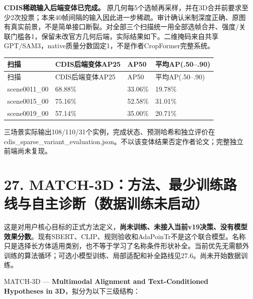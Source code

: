 \documentclass[UTF8,fontset=fandol]{ctexart}
\begin{document}
\textbf{CDIS稀疏输入后端变体已完成。} 原几何每5个选帧再采样，并在3D合并前要求至少2次投票；本来40帧间隔的输入因此进一步稀疏。审计确认米制深度正确、原图有真实前景，不是简单接口断裂。对全部三个扫描统一用全部选帧合并、强度/关联门槛各1，保留未改官方几何后端，实际结果如下。二维掩码来自共享GPT/SAM3，native质量分数固定1，不是作者CropFormer完整系统。



{\small
\begin{longtable}{|p{}|p{}|p{}|p{}|}
\hline
扫描 & CDIS后端变体AP25 & AP50 & 平均AP(.50–.90) \\ \hline
\endfirsthead
\hline
扫描 & CDIS后端变体AP25 & AP50 & 平均AP(.50–.90) \\ \hline
\endhead
scene0011\_00 & 68.88\% & 33.06\% & 19.78\% \\ \hline
scene0015\_00 & 75.16\% & 52.58\% & 31.01\% \\ \hline
scene0019\_00 & 57.14\% & 35.00\% & 20.71\% \\ \hline
\end{longtable}
}

三场景实际输出108/110/31个实例，完成状态、预测哈希和独立评价在cdis\_sparse\_variant\_evaluation.json。不以该变体结果否定作者论文；完整独立前端尚未复现。



\section*{27. MATCH-3D：方法、最少训练路线与自主诊断（数据训练未启动）}

这是对用户核心目标的正式方法定义，\textbf{尚未训练、未接入当前v19决策、没有模型效果分数}。现有SBERT、CLIP、规则验收和AdaPoinTr不是这个联合模型。名称只是选择长方体适用类别，也不等于学习了名称条件形状补全。当前优先无需额外训练的算法循环；可选小模型训练、局部适配和补全路线见27.6。尚未开始数据训练。



MATCH-3D — \textbf{Multimodal Alignment and Text-Conditioned Hypotheses in 3D}，拟分为以下三级结构：
\end{document}
